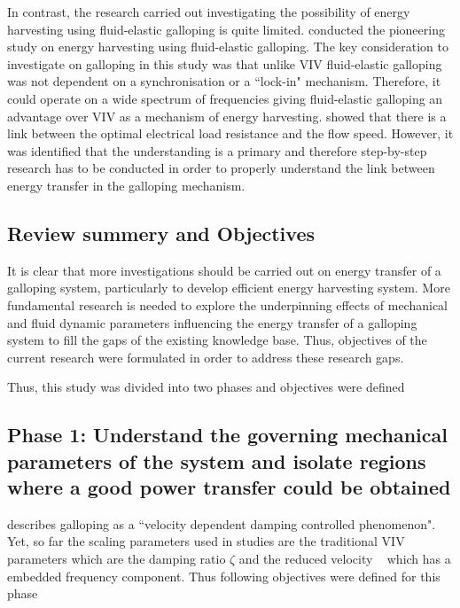 In contrast, the research carried out investigating the possibility of energy harvesting using fluid-elastic galloping is quite limited. \citet{Barrero-Gil2010a} conducted the pioneering study on energy harvesting using fluid-elastic galloping. The key consideration to investigate on galloping in this study was that unlike VIV fluid-elastic galloping was not dependent on a synchronisation or a ``lock-in" mechanism. Therefore, it could operate on a wide spectrum of frequencies giving fluid-elastic galloping an advantage over VIV as a mechanism of energy harvesting. \citet{vicente-Ludlam2014} showed that there is a link between the optimal electrical load resistance and the flow speed. However, it was identified that the understanding is a primary and therefore step-by-step research has to be conducted in order to properly understand the link between energy transfer in the galloping mechanism.

\subsection{Review summery and Objectives}

 It is clear that more investigations should be carried out on energy transfer of a galloping system, particularly to develop efficient energy harvesting system. More fundamental research is needed to explore the underpinning effects of mechanical and fluid dynamic parameters influencing the energy transfer of a galloping system to fill the gaps of the existing knowledge base. Thus, objectives of the current research were formulated in order to address these research gaps.
 
 Thus, this study was divided into two phases and objectives were defined 
 
 \subsection*{Phase 1: Understand the governing mechanical parameters of the system and isolate regions where a good power transfer could be obtained}
 
 \citet{Paidoussis2010} describes galloping as a ``velocity dependent damping controlled phenomenon". Yet, so far the scaling parameters used in studies are the traditional VIV parameters which are the damping ratio $\zeta$ and the reduced velocity \ustar\ \citep{Barrero-Gil2010a} which has a embedded frequency component. Thus following objectives were defined for this phase 
 
